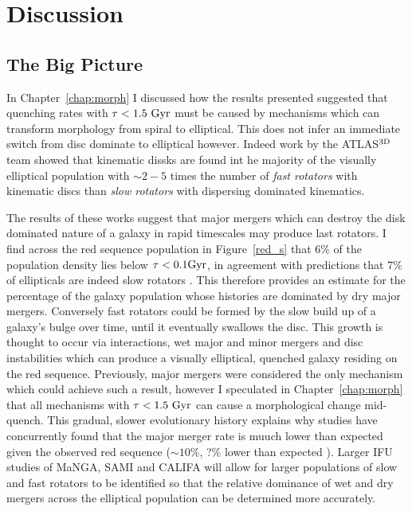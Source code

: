 \chapter{Discussion}

\section{The Big Picture}\label{sec:bigpic}

In Chapter~\ref{chap:morph} I discussed how the results presented suggested that quenching rates with $\tau < 1.5~\rm{Gyr}$ must be caused by mechanisms which can transform morphology from spiral to elliptical. This does not infer an immediate switch from disc dominate to elliptical however. Indeed work by the \textsc{ATLAS}$^{\rm{3D}}$ team showed that kinematic dissks are found int he majority of the visually elliptical population \citep{citationbomb} with $\sim2-5$ times the number of \emph{fast rotators} with kinematic discs than \emph{slow rotators} with dispersing dominated kinematics. 

The results of these works suggest that major mergers which can destroy the disk dominated nature of a galaxy \citep{refs} in rapid timescales may produce last rotators. I find across the red sequence population in Figure~\ref{red_s} that $6\%$ of the population density lies below $\tau <0.1 \rm{Gyr}$, in agreement with predictions that $7\%$ of ellipticals are indeed slow rotators \citep{refs}. This therefore provides an estimate for the percentage of the galaxy population whose histories are dominated by dry major mergers.  Conversely fast rotators could be formed by the slow build up of a galaxy's bulge over time, until it eventually swallows the disc. This growth is thought to occur via interactions, wet major and minor mergers and disc instabilities which can produce a visually elliptical, quenched galaxy residing on the red sequence. Previously, major mergers were considered the only mechanism which could achieve such a result, however I speculated in Chapter~\ref{chap:morph} that all mechanisms with $\tau < 1.5 ~\rm{Gyr}$ can cause a morphological change mid-quench. This gradual, slower evolutionary history explains why studies have concurrently found that the major merger rate is muuch lower than expected given the observed red sequence ($\sim 10\%$,  ?$\%$ lower than expected \citealt{refs}). Larger IFU studies of MaNGA, SAMI and CALIFA will allow for larger populations of slow and fast rotators to be identified so that the relative dominance of wet and dry mergers across the elliptical population can be determined more accurately. 

